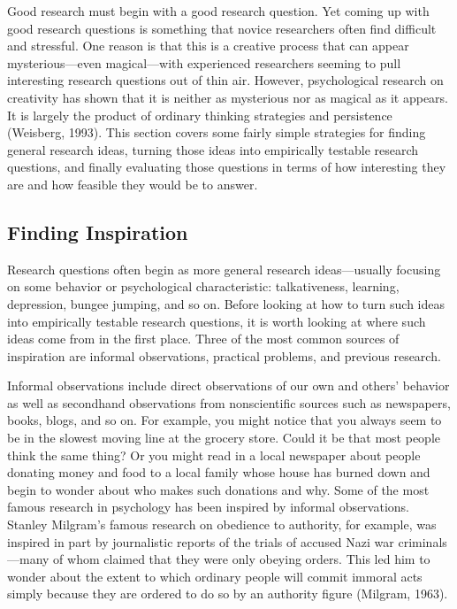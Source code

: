 Good research must begin with a good research question. Yet coming up with good research questions is something that novice researchers often find difficult and stressful. One reason is that this is a creative process that can appear mysterious---even magical---with experienced researchers seeming to pull interesting research questions out of thin air. However, psychological research on creativity has shown that it is neither as mysterious nor as magical as it appears. It is largely the product of ordinary thinking strategies and persistence (Weisberg, 1993). This section covers some fairly simple strategies for finding general research ideas, turning those ideas into empirically testable research questions, and finally evaluating those questions in terms of how interesting they are and how feasible they would be to answer.

\subsection{Finding Inspiration}

Research questions often begin as more general research ideas---usually focusing on some behavior or psychological characteristic: talkativeness, learning, depression, bungee jumping, and so on. Before looking at how to turn such ideas into empirically testable research questions, it is worth looking at where such ideas come from in the first place. Three of the most common sources of inspiration are informal observations, practical problems, and previous research.

Informal observations include direct observations of our own and others' behavior as well as secondhand observations from nonscientific sources such as newspapers, books, blogs, and so on. For example, you might notice that you always seem to be in the slowest moving line at the grocery store. Could it be that most people think the same thing? Or you might read in a local newspaper about people donating money and food to a local family whose house has burned down and begin to wonder about who makes such donations and why. Some of the most famous research in psychology has been inspired by informal observations. Stanley Milgram's famous research on obedience to authority, for example, was inspired in part by journalistic reports of the trials of accused Nazi war criminals---many of whom claimed that they were only obeying orders. This led him to wonder about the extent to which ordinary people will commit immoral acts simply because they are ordered to do so by an authority figure (Milgram, 1963).

